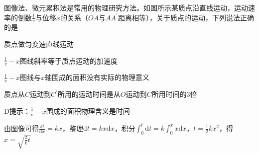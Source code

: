 图像法、微元累积法是常用的物理研究方法。如图所示某质点沿直线运动，运动速率的倒数\(\frac{1}{v}\)与位移\(x\)的关系（\(OA\)与\(AA^\prime\)距离相等），关于质点的运动，下列说法正确的是\paren[D]

\begin{choices}
    \item 质点做匀变速直线运动
    \item \(\frac{1}{v} - x\)图线斜率等于质点运动的加速度
    \item \(\frac{1}{v} - x\)图线与\(x\)轴围成的面积没有实际的物理意义
    \item 质点从\(C\)运动到\(C^\prime\)所用的运动时间是从\(O\)运动到\(C\)所用时间的3倍
\end{choices}
 \begin{answer}
    D\qquad 提示：\(\frac{1}{v} - x\)围成的面积物理含义是时间

    \kaishu 由图像可得\(\frac{\mathrm{d}t}{\mathrm{d}x} = kx\)，整理\(\mathrm{d}t = kx \mathrm{d}x\)，积分\(\int_0^t \mathrm{d}t = k\int_{0}^{x}x \mathrm{d}x\)，\(t = \frac{1}{2}kx^2\)，得\(x = \sqrt{\frac{2}{k}t}\)
 \end{answer}